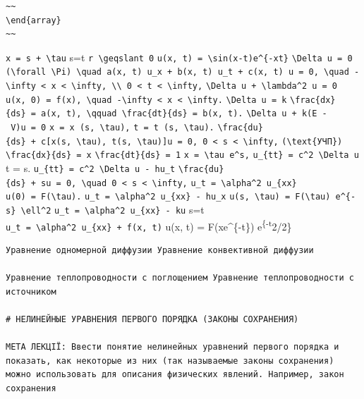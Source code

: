 \documentclass[
  ukrainian,
]{article}
\begin{document}
\begin{verbatim}
~~
\end{array}
~~
\end{verbatim}

\texttt{x\ =\ s\ +\ \textbackslash{}tau} s=t
\texttt{r\ \textbackslash{}geqslant\ 0}
\texttt{u(x,\ t)\ =\ \textbackslash{}sin(x-t)e\^{}\{-xt\}}
\texttt{\textbackslash{}Delta\ u\ =\ 0}
\texttt{(\textbackslash{}forall\ \textbackslash{}Pi)\ \textbackslash{}quad\ a(x,\ t)\ u\_x\ +\ b(x,\ t)\ u\_t\ +\ c(x,\ t)\ u\ =\ 0,\ \textbackslash{}quad\ -\textbackslash{}infty\ \textless{}\ x\ \textless{}\ \textbackslash{}infty,\ \textbackslash{}\textbackslash{}\ 0\ \textless{}\ t\ \textless{}\ \textbackslash{}infty,}
\texttt{\textbackslash{}Delta\ u\ +\ \textbackslash{}lambda\^{}2\ u\ =\ 0}
\texttt{u(x,\ 0)\ =\ f(x),\ \textbackslash{}quad\ -\textbackslash{}infty\ \textless{}\ x\ \textless{}\ \textbackslash{}infty.}
\texttt{\textbackslash{}Delta\ u\ =\ k}
\texttt{\textbackslash{}frac\{dx\}\{ds\}\ =\ a(x,\ t),\ \textbackslash{}qquad\ \textbackslash{}frac\{dt\}\{ds\}\ =\ b(x,\ t).}
\texttt{\textbackslash{}Delta\ u\ +\ k(E\ -\ V)u\ =\ 0}
\texttt{x\ =\ x\ (s,\ \textbackslash{}tau),}
\texttt{t\ =\ t\ (s,\ \textbackslash{}tau).}
\texttt{\textbackslash{}frac\{du\}\{ds\}\ +\ c{[}x(s,\ \textbackslash{}tau),\ t(s,\ \textbackslash{}tau){]}u\ =\ 0,\ 0\ \textless{}\ s\ \textless{}\ \textbackslash{}infty,}
\texttt{(\textbackslash{}text\{УЧП\})}
\texttt{\textbackslash{}frac\{dx\}\{ds\}\ =\ x}
\texttt{\textbackslash{}frac\{dt\}\{ds\}\ =\ 1}
\texttt{x\ =\ \textbackslash{}tau\ e\^{}s,}
\texttt{u\_\{tt\}\ =\ c\^{}2\ \textbackslash{}Delta\ u} t = s.
\texttt{u\_\{tt\}\ =\ c\^{}2\ \textbackslash{}Delta\ u\ -\ hu\_t}
\texttt{\textbackslash{}frac\{du\}\{ds\}\ +\ su\ =\ 0,\ \textbackslash{}quad\ 0\ \textless{}\ s\ \textless{}\ \textbackslash{}infty,}
\texttt{u\_t\ =\ \textbackslash{}alpha\^{}2\ u\_\{xx\}}
\texttt{u(0)\ =\ F(\textbackslash{}tau).}
\texttt{u\_t\ =\ \textbackslash{}alpha\^{}2\ u\_\{xx\}\ -\ hu\_x}
\texttt{u(s,\ \textbackslash{}tau)\ =\ F(\textbackslash{}tau)\ e\^{}\{-s\}\ \textbackslash{}ell\^{}2}
\texttt{u\_t\ =\ \textbackslash{}alpha\^{}2\ u\_\{xx\}\ -\ ku} s=t
\texttt{u\_t\ =\ \textbackslash{}alpha\^{}2\ u\_\{xx\}\ +\ f(x,\ t)}
u(x, t) = F(xe\^{}\{-t\}) e\textsuperscript{\{-t}2/2\}

\begin{verbatim}
Уравнение одномерной диффузии Уравнение конвективной диффузии

Уравнение теплопроводности с поглощением Уравнение теплопроводности с источником

# НЕЛИНЕЙНЫЕ УРАВНЕНИЯ ПЕРВОГО ПОРЯДКА (ЗАКОНЫ СОХРАНЕНИЯ)

МЕТА ЛЕКЦІЇ: Ввести понятие нелинейных уравнений первого порядка и показать, как некоторые из них (так называемые законы сохранения) можно использовать для описания физических явлений. Например, закон сохранения
\end{verbatim}
\end{document}

